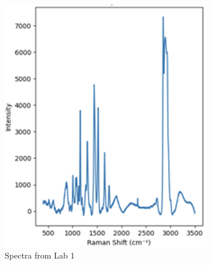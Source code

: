 \begin{figure}[htbp]
  \centering
  \begin{subfigure}[b]{0.45\textwidth}
    \centering
    \includegraphics[width=\textwidth]{Figures/HORIBA.png}
    \caption{Spectra from Lab 1}
    \label{fig: horiba}
  \end{subfigure}
  \hfill
  \begin{subfigure}[b]{0.45\textwidth}
    \centering

\end{subfigure}
\end{figure}

